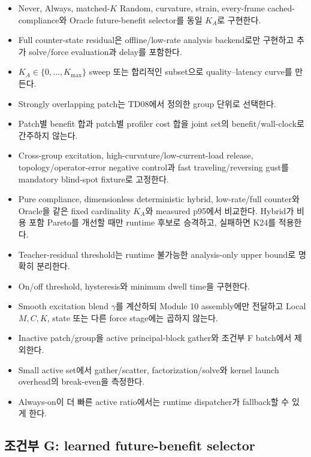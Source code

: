 \documentclass[10pt,a4paper]{article}
\newcommand{\todo}{\textcolor{TodoGray}{\(\square\)}}
\begin{document}
\begin{itemize}
  \item[\todo] Never, Always, matched-\(K\) Random, curvature, strain, every-frame cached-compliance와 Oracle future-benefit selector를 동일 \(K_A\)로 구현한다.
  \item[\todo] Full counter-state residual은 offline/low-rate analysis backend로만 구현하고 추가 solve/force evaluation과 delay를 포함한다.
  \item[\todo] \(K_A\in\{0,\ldots,K_{\max}\}\) sweep 또는 합리적인 subset으로 quality--latency curve를 만든다.
  \item[\todo] Strongly overlapping patch는 TD08에서 정의한 group 단위로 선택한다.
  \item[\todo] Patch별 benefit 합과 patch별 profiler cost 합을 joint set의 benefit/wall-clock로 간주하지 않는다.
  \item[\todo] Cross-group excitation, high-curvature/low-current-load release,
  topology/operator-error negative control과 fast traveling/reversing gust를 mandatory blind-spot fixture로 고정한다.
  \item[\todo] Pure compliance, dimensionless deterministic hybrid, low-rate/full counter와
  Oracle을 같은 fixed cardinality \(K_A\)와 measured p95에서 비교한다.
  Hybrid가 비용 포함 Pareto를 개선할 때만 runtime 후보로 승격하고, 실패하면 K24를 적용한다.
  \item[\todo] Teacher-residual threshold는 runtime 불가능한 analysis-only upper bound로 명확히 분리한다.
  \item[\todo] On/off threshold, hysteresis와 minimum dwell time을 구현한다.
  \item[\todo] Smooth excitation blend \(\gamma\)를 계산하되 Module 10 assembly에만 전달하고 Local \(M,C,K\), state 또는 다른 force stage에는 곱하지 않는다.
  \item[\todo] Inactive patch/group을 active principal-block gather와 조건부 F batch에서 제외한다.
  \item[\todo] Small active set에서 gather/scatter, factorization/solve와 kernel launch overhead의 break-even을 측정한다.
  \item[\todo] Always-on이 더 빠른 active ratio에서는 runtime dispatcher가 fallback할 수 있게 한다.
\end{itemize}

\subsection*{조건부 G: learned future-benefit selector}
\end{document}
